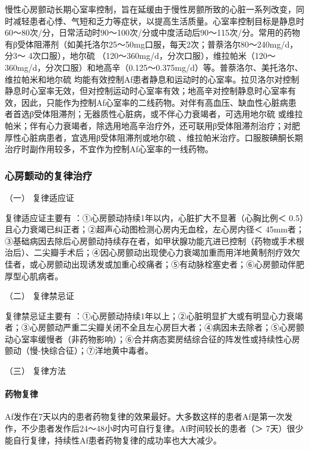 慢性心房颤动长期心室率控制，旨在延缓由于慢性房颤所致的心脏一系列改变，同时减轻患者心悸、气短和乏力等症状，以提高生活质量。心室率控制目标是静息时60～80次/分，日常活动时90～100次/分或中度活动后90～115次/分。常用的药物有β受体阻滞剂（如美托洛尔25～50mg口服，每天2次；普萘洛尔80～240mg/d，分3～
4次口服），地尔硫{}
（120～360mg/d，分次口服），维拉帕米（120～360mg/d，分次口服）和地高辛（0.125～0.375mg/d）等。普萘洛尔、美托洛尔、维拉帕米和地尔硫{}
均能有效控制Af患者静息和运动时的心室率。拉贝洛尔对控制静息时心室率无效，但对控制运动时心室率有效；地高辛对控制静息时心室率有效，因此，只能作为控制Af心室率的二线药物。对伴有高血压、缺血性心脏病患者首选β受体阻滞剂；无器质性心脏病，或不伴心力衰竭者，可选用地尔硫{}
或维拉帕米；伴有心力衰竭者，除选用地高辛治疗外，还可联用β受体阻滞剂治疗；对肥厚性心脏病患者，宜选用β受体阻滞剂或地尔硫{}
、维拉帕米治疗。口服胺碘酮长期治疗时副作用较多，不宜作为控制Af心室率的一线药物。

\subsubsection{心房颤动的复律治疗}

\hypertarget{text00291.htmlux5cux23CHP10-2-4-3-3-1}{}
（一） 复律适应证

复律适应证主要有 ：①心房颤动持续1年以内，心脏扩大不显著（心胸比例＜
0.5）且心力衰竭已纠正者；②超声心动图检测心房内无血栓，左心房内径＜
45mm者；③基础病因去除后心房颤动持续存在者，如甲状腺功能亢进已控制（药物或手术根治后）、二尖瓣手术后；④因心房颤动出现使心力衰竭加重而用洋地黄制剂疗效欠佳者，或心房颤动出现诱发或加重心绞痛者；⑤有动脉栓塞史者；⑥心房颤动伴肥厚型心肌病者。

\hypertarget{text00291.htmlux5cux23CHP10-2-4-3-3-2}{}
（二） 复律禁忌证

复律禁忌证主要有
：①心房颤动持续1年以上；②心脏明显扩大或有明显心力衰竭者；③心房颤动严重二尖瓣关闭不全且左心房巨大者；④病因未去除者；⑤心房颤动心室率缓慢者（非药物影响）；⑥合并病态窦房结综合征的阵发性或持续性心房颤动（慢-快综合征）；⑦洋地黄中毒者。

\hypertarget{text00291.htmlux5cux23CHP10-2-4-3-3-3}{}
（三） 复律方法

\paragraph{药物复律}

Af发作在7天以内的患者药物复律的效果最好。大多数这样的患者Af是第一次发作，不少患者发作后24～48小时内可自行复律。Af时间较长的患者（＞
7天）很少能自行复律，持续性Af患者药物复律的成功率也大大减少。

